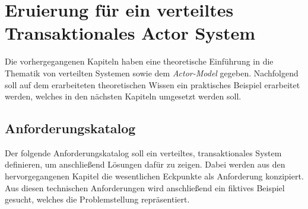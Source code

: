 \chapter{Eruierung für ein verteiltes Transaktionales Actor System} 
\label{cha:Eruierung}
Die vorhergegangenen Kapiteln haben eine theoretische Einführung in die Thematik von verteilten Systemen sowie dem \textit{Actor-Model}  gegeben. Nachfolgend soll auf dem erarbeiteten theoretischen Wissen ein praktisches Beispiel erarbeitet werden, welches in den nächsten Kapiteln umgesetzt werden soll.   
% 
% 
% 

\section{Anforderungskatalog} \label{sec:Eruierung:technicalRequierements}
Der folgende Anforderungskatalog soll ein verteiltes, transaktionales System definieren, um anschließend Lösungen dafür zu zeigen. Dabei werden aus den hervorgegangenen Kapitel die  wesentlichen Eckpunkte als Anforderung konzipiert. Aus diesen technischen Anforderungen wird anschließend ein fiktives Beispiel gesucht, welches die Problemstellung  repräsentiert.
% 
% 

